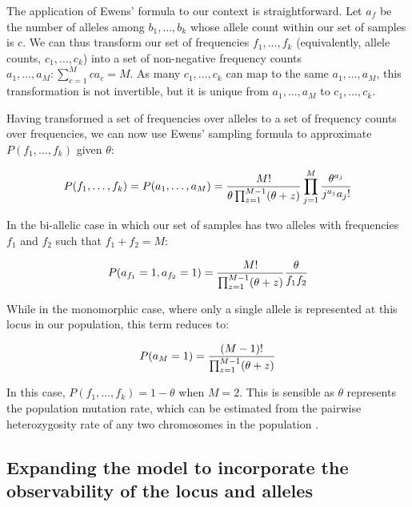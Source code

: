 \documentclass{article}
\begin{document}
The application of Ewens' formula to our context is straightforward.  Let $a_f$ be the number of alleles among $b_1,\ldots,b_k$ whose allele count within our set of samples is $c$.  We can thus transform our set of frequencies $f_1,\ldots,f_k$ (equivalently, allele counts, $c_1,\ldots,c_k$) into a set of non-negative frequency counts $a_1,\ldots,a_M : \sum_{c=1}^M{ca_c} = M$.  As many $c_1,\ldots,c_k$ can map to the same $a_1,\ldots,a_M$, this transformation is not invertible, but it is unique from $a_1,\ldots,a_M$ to $c_1,\ldots,c_k$.

Having transformed a set of frequencies over alleles to a set of frequency counts over frequencies, we can now use Ewens' sampling formula to approximate $P(f_1,\ldots,f_k)$ given $\theta$:

\begin{equation}
P(f_1,\ldots,f_k) =
P(a_1,\ldots,a_M) = 
{M! \over \theta \prod_{z=1}^{M-1}(\theta+z)}
\prod_{j=1}^M{\theta^{a_j} \over j^{a_j} a_j!}
\end{equation}

In the bi-allelic case in which our set of samples has two alleles with frequencies $f_1$ and $f_2$ such that $f_1 + f_2 = M$:

\begin{equation}
P(a_{f_1} = 1, a_{f_2} = 1) = 
{M! \over \prod_{z=1}^{M-1}(\theta+z)}
{\theta \over f_1 f_2}
\end{equation}

While in the monomorphic case, where only a single allele is represented at this locus in our population, this term reduces to:

\begin{equation}
P(a_M = 1) = 
{(M-1)! \over \prod_{z=1}^{M-1}(\theta+z)}
\end{equation}

In this case, $P(f_1,\ldots,f_k) = 1 - \theta$ when $M = 2$.  This is sensible as $\theta$ represents the population mutation rate, which can be estimated from the pairwise heterozygosity rate of any two chromosomes in the population \citep{watterson1975, tajima1983}.

\subsection{Expanding the model to incorporate the observability of the locus and alleles}
\label{sec:modelsequencability}
\end{document}
